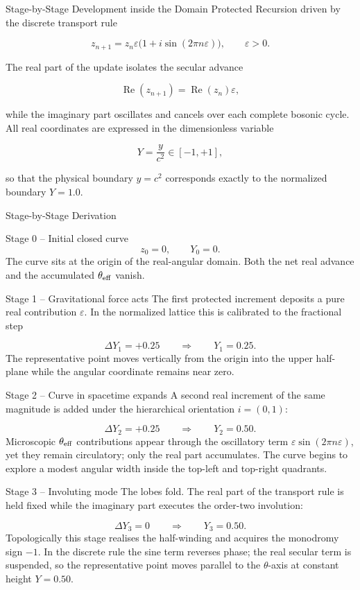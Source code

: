 Stage-by-Stage Development inside the Domain  
Protected Recursion driven by the discrete transport rule

\[
z_{n+1}
=
z_n
\varepsilon\bigl(1+i\sin(2\pi n\varepsilon)\bigr),
\qquad
\varepsilon>0.
\]

The real part of the update isolates the secular advance

\[
\operatorname{Re}(z_{n+1})
=
\operatorname{Re}(z_n)
\varepsilon,
\]

while the imaginary part oscillates and cancels over each complete bosonic cycle.  
All real coordinates are expressed in the dimensionless variable

\[
Y
=
\frac{y}{c^2}
\in[-1,+1],
\]

so that the physical boundary \(y=c^2\) corresponds exactly to the normalized boundary \(Y=1.0\).

Stage-by-Stage Derivation

Stage 0 – Initial closed curve  
\[
z_0=0,\qquad Y_0=0.
\]
The curve sits at the origin of the real-angular domain. Both the net real advance and the accumulated \(\theta_{\rm eff}\) vanish.

Stage 1 – Gravitational force acts  
The first protected increment deposits a pure real contribution \(\varepsilon\). In the normalized lattice this is calibrated to the fractional step

\[
\Delta Y_1=+0.25
\qquad\Rightarrow\qquad
Y_1=0.25.
\]
The representative point moves vertically from the origin into the upper half-plane while the angular coordinate remains near zero.

Stage 2 – Curve in spacetime expands  
A second real increment of the same magnitude is added under the hierarchical orientation \(i=(0,1)\):

\[
\Delta Y_2=+0.25
\qquad\Rightarrow\qquad
Y_2=0.50.
\]
Microscopic \(\theta_{\rm eff}\) contributions appear through the oscillatory term \(\varepsilon\sin(2\pi n\varepsilon)\), yet they remain circulatory; only the real part accumulates. The curve begins to explore a modest angular width inside the top-left and top-right quadrants.

Stage 3 – Involuting mode  
The lobes fold. The real part of the transport rule is held fixed while the imaginary part executes the order-two involution:

\[
\Delta Y_3=0
\qquad\Rightarrow\qquad
Y_3=0.50.
\]
Topologically this stage realises the half-winding and acquires the monodromy sign \(-1\). In the discrete rule the sine term reverses phase; the real secular term is suspended, so the representative point moves parallel to the \(\theta\)-axis at constant height \(Y=0.50\).

